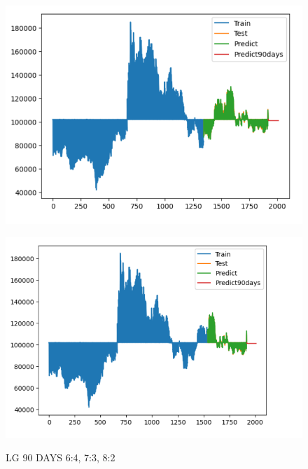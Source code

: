 \documentclass{article}
\begin{document}
\begin{multicols}{2}
\begin{figure}[H]
\begin{minipage}{0.15\textwidth}
    \label{fig:1}
    \end{minipage}%
    \begin{minipage}{0.15\textwidth}
    \centering
    \includegraphics[width=1\textwidth]{Image/GradientBoosting/LG_90_7_3_GradientBoostingRegressor.png}
  
    \label{fig:2}
    \end{minipage}%
    \begin{minipage}{0.15\textwidth}
    \centering
    \includegraphics[width=1\textwidth]{Image/GradientBoosting/LG_90_8_2_GradientBoostingRegressor.png}

    \label{fig:3}
    \end{minipage}
    \caption{LG 90 DAYS  6:4, 7:3, 8:2 }
\end{figure}


\end{multicols}
\end{document}
